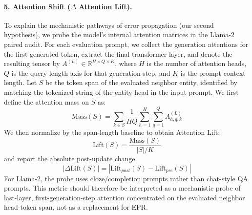 \paragraph{5. Attention Shift ($\Delta$ Attention Lift).}
To explain the mechanistic pathways of error propagation (our second hypothesis), we probe the model's internal attention matrices in the Llama-2 paired audit. For each evaluation prompt, we collect the generation attentions for the first generated token, extract the final transformer layer, and denote the resulting tensor by $A^{(L)} \in \mathbb{R}^{H \times Q \times K}$, where $H$ is the number of attention heads, $Q$ is the query-length axis for that generation step, and $K$ is the prompt context length. Let $S$ be the token span of the evaluated neighbor entity, identified by matching the tokenized string of the entity head in the input prompt. We first define the attention mass on $S$ as:
\begin{equation}
\mathrm{Mass}(S) = \sum_{k \in S} \frac{1}{HQ} \sum_{h=1}^{H} \sum_{q=1}^{Q} A^{(L)}_{h,q,k}
\label{eq:att_mass}
\end{equation}
We then normalize by the span-length baseline to obtain Attention Lift:
\begin{equation}
\mathrm{Lift}(S) = \frac{\mathrm{Mass}(S)}{|S|/K}
\label{eq:att_lift}
\end{equation}
and report the absolute post-update change
\begin{equation}
|\Delta \mathrm{Lift}(S)| = |\mathrm{Lift}_{post}(S) - \mathrm{Lift}_{pre}(S)|
\label{eq:delta_lift}
\end{equation}
For Llama-2, the probe uses cloze/completion prompts rather than chat-style QA prompts. This metric should therefore be interpreted as a mechanistic probe of last-layer, first-generation-step attention concentrated on the evaluated neighbor head-token span, not as a replacement for EPR.
